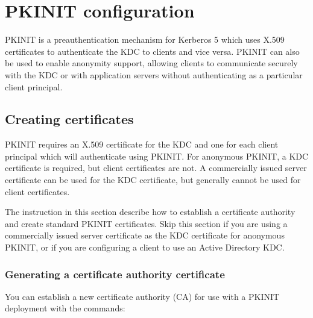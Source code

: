 \documentclass[letterpaper,10pt,english]{sphinxmanual}
\begin{document}
\sphinxstepscope


\chapter{PKINIT configuration}
\label{\detokenize{admin/pkinit:pkinit-configuration}}\label{\detokenize{admin/pkinit:pkinit}}\label{\detokenize{admin/pkinit::doc}}
\sphinxAtStartPar
PKINIT is a preauthentication mechanism for Kerberos 5 which uses
X.509 certificates to authenticate the KDC to clients and vice versa.
PKINIT can also be used to enable anonymity support, allowing clients
to communicate securely with the KDC or with application servers
without authenticating as a particular client principal.


\section{Creating certificates}
\label{\detokenize{admin/pkinit:creating-certificates}}
\sphinxAtStartPar
PKINIT requires an X.509 certificate for the KDC and one for each
client principal which will authenticate using PKINIT.  For anonymous
PKINIT, a KDC certificate is required, but client certificates are
not.  A commercially issued server certificate can be used for the KDC
certificate, but generally cannot be used for client certificates.

\sphinxAtStartPar
The instruction in this section describe how to establish a
certificate authority and create standard PKINIT certificates.  Skip
this section if you are using a commercially issued server certificate
as the KDC certificate for anonymous PKINIT, or if you are configuring
a client to use an Active Directory KDC.


\subsection{Generating a certificate authority certificate}
\label{\detokenize{admin/pkinit:generating-a-certificate-authority-certificate}}
\sphinxAtStartPar
You can establish a new certificate authority (CA) for use with a
PKINIT deployment with the commands:

\begin{sphinxVerbatim}[commandchars=\\\{\}]
    
         
\end{sphinxVerbatim}
\end{document}
